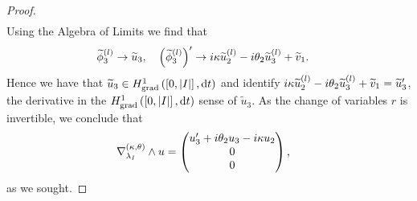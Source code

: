 \begin{proof}
\begin{align*}
	\end{align*}
	Using the Algebra of Limits we find that
	\begin{align*}
		\widetilde{\phi}^{(l)}_3 \rightarrow \widetilde{u}_3, 
		&\quad \left( \widetilde{\phi}^{(l)}_3 \right)' \rightarrow i\kappa\widetilde{u}^{(l)}_2 - i\theta_2\widetilde{u}^{(l)}_3 + \widetilde{v}_1.
	\end{align*}
	Hence we have that $\widetilde{u}_3\in H^1_\mathrm{grad}\left( \left[ 0,\left\lvert I \right\rvert \right], \mathrm{d}t \right)$ and identify $i\kappa\widetilde{u}^{(l)}_2 - i\theta_2\widetilde{u}^{(l)}_3 + \widetilde{v}_1 = \widetilde{u}_3'$, the derivative in the $H^1_\mathrm{grad}\left( \left[ 0,\left\lvert I \right\rvert \right], \mathrm{d}t \right)$ sense of $\widetilde{u}_3$.
	As the change of variables $r$ is invertible, we conclude that
	\begin{align*}
		\nabla_{\lambda_I}^{\left( \kappa, \theta \right)}\wedge u &= 
		\begin{pmatrix} u_3' + i\theta_2 u_3 - i\kappa u_2 \\ 0 \\ 0 \end{pmatrix},
	\end{align*}
	as we sought.
\end{proof}

